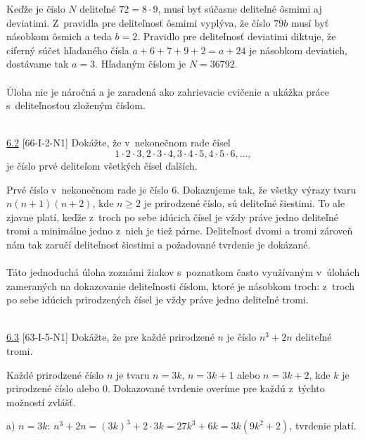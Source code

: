 \rie Keďže je číslo $N$ deliteľné $72=8\cdot 9$, musí byť súčasne deliteľné ôsmimi aj deviatimi. Z~pravidla pre deliteľnosť ôsmimi vyplýva, že číslo $\overline{79b}$ musí byť násobkom ôsmich a teda $b=2$. Pravidlo pre deliteľnosť deviatimi diktuje, že ciferný súčet hľadaného čísla $a+6+7+9+2=a+24$ je násobkom deviatich, dostávame tak $a=3$. Hľadaným číslom je $N=36792$.\\
\\
\kom Úloha nie je náročná a je zaradená ako zahrievacie cvičenie a ukážka práce s~deliteľnosťou zloženým číslom.\\
\\
\begin{tcolorbox}[breakable,notitle,boxrule=0pt,colback=light-gray,colframe=light-gray]\ul{6.2} [66-I-2-N1] Dokážte, že v~nekonečnom rade čísel
$$ 1 \cdot 2 \cdot 3, 2 \cdot 3 \cdot 4, 3 \cdot 4 \cdot 5, 4 \cdot 5 \cdot 6, \ldots ,$$
je číslo prvé deliteľom všetkých čísel ďalších.

\end{tcolorbox}

\rie Prvé číslo v~nekonečnom rade je číslo 6. Dokazujeme tak, že všetky výrazy tvaru $n(n+1)(n+2)$, kde $n\geq 2$ je prirodzené číslo, sú deliteľné šiestimi. To ale zjavne platí, keďže z~troch po sebe idúcich čísel je vždy práve jedno deliteľné tromi a minimálne jedno z~nich je tiež párne. Deliteľnosť dvomi a tromi zároveň nám tak zaručí deliteľnosť šiestimi a požadované tvrdenie je dokázané.\\
\\
\kom Táto jednoduchá úloha zoznámi žiakov s~poznatkom často využívaným v~úlohách zameraných na dokazovanie deliteľnosti číslom, ktoré je násobkom troch: z~troch po sebe idúcich prirodzených čísel je vždy práve jedno deliteľné tromi.\\
\\
\begin{tcolorbox}[breakable,notitle,boxrule=0pt,colback=light-gray,colframe=light-gray]\ul{6.3} [63-I-5-N1] Dokážte, že pre každé prirodzené $n$ je číslo $n^3+ 2n$ deliteľné tromi.

\end{tcolorbox}

\rie Každé prirodzené číslo $n$ je tvaru $n=3k$, $n=3k+1$ alebo $n=3k+2$, kde $k$ je prirodzené číslo alebo 0. Dokazované tvrdenie overíme pre každú z~týchto možností zvlášť.

a) $n=3k$: $n^3+2n=(3k)^3+2\cdot 3k=27k^3+6k=3k(9k^2+2)$, tvrdenie platí.

